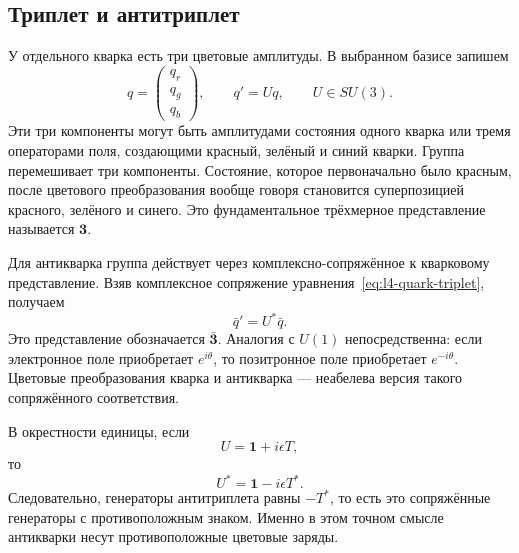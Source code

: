 \subsection{Триплет и антитриплет}

У отдельного кварка есть три цветовые амплитуды. В выбранном базисе запишем
\begin{equation}
q=
\begin{pmatrix}
q_r\\q_g\\q_b
\end{pmatrix},
\qquad
q'=Uq,
\qquad U\in SU(3).
\label{eq:l4-quark-triplet}
\end{equation}
Эти три компоненты могут быть амплитудами состояния одного кварка или тремя
операторами поля, создающими красный, зелёный и синий кварки. Группа перемешивает
три компоненты. Состояние, которое первоначально было красным, после цветового преобразования
вообще говоря становится суперпозицией красного, зелёного и синего. Это фундаментальное
трёхмерное представление называется \(\boldsymbol 3\).

Для антикварка группа действует через комплексно-сопряжённое к кварковому
представление. Взяв комплексное сопряжение уравнения~\eqref{eq:l4-quark-triplet}, получаем
\begin{equation}
\bar q'=U^*\bar q.
\end{equation}
Это представление обозначается \(\bar{\boldsymbol 3}\). Аналогия с \(U(1)\)
непосредственна: если электронное поле приобретает \(e^{i\theta}\), то позитронное поле
приобретает \(e^{-i\theta}\). Цветовые преобразования кварка и антикварка —
неабелева версия такого сопряжённого соответствия.

В окрестности единицы, если
\begin{equation}
U=\boldsymbol 1+i\epsilon T,
\end{equation}
то
\begin{equation}
U^*=\boldsymbol 1-i\epsilon T^*.
\end{equation}
Следовательно, генераторы антитриплета равны \(-T^*\), то есть это сопряжённые генераторы с противоположным
знаком. Именно в этом точном смысле антикварки несут противоположные цветовые
заряды.

\begin{classroomqa}
\end{classroomqa}

